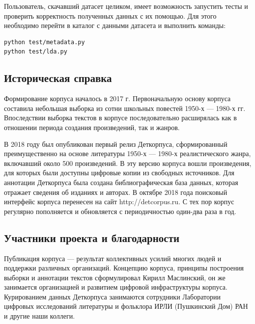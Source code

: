 \documentclass[
]{article}
\begin{document}
Пользователь, скачавший датасет целиком, имеет возможность запустить
тесты и проверить корректность полученных данных с их помощью. Для этого
необходимо перейти в каталог с данными датасета и выполнить команды:

\begin{verbatim}
python test/metadata.py
python test/lda.py
\end{verbatim}

\hypertarget{ux438ux441ux442ux43eux440ux438ux447ux435ux441ux43aux430ux44f-ux441ux43fux440ux430ux432ux43aux430}{%
\subsection{Историческая
справка}\label{ux438ux441ux442ux43eux440ux438ux447ux435ux441ux43aux430ux44f-ux441ux43fux440ux430ux432ux43aux430}}

Формирование корпуса началось в 2017 г. Первоначальную основу корпуса
составила небольшая выборка из сотни школьных повестей 1950-х --- 1980-х
гг. Впоследствии выборка текстов в корпусе последовательно расширялась
как в отношении периода создания произведений, так и жанров.

В 2018 году был опубликован первый релиз Деткорпуса, сформированный
преимущественно на основе литературы 1950-х --- 1980-х реалистического
жанра, включавший около 500 произведений. В эту версию корпуса вошли
произведения, для которых были доступны цифровые копии из свободных
источников. Для аннотации Деткорпуса была создана библиографическая база
данных, которая отражает сведения об изданиях и авторах. В октябре 2018
года поисковый интерфейс корпуса перенесен на сайт http://detcorpus.ru.
С тех пор корпус регулярно пополняется и обновляется с периодичностью
один-два раза в год.

\hypertarget{ux443ux447ux430ux441ux442ux43dux438ux43aux438-ux43fux440ux43eux435ux43aux442ux430-ux438-ux431ux43bux430ux433ux43eux434ux430ux440ux43dux43eux441ux442ux438}{%
\subsection{Участники проекта и
благодарности}\label{ux443ux447ux430ux441ux442ux43dux438ux43aux438-ux43fux440ux43eux435ux43aux442ux430-ux438-ux431ux43bux430ux433ux43eux434ux430ux440ux43dux43eux441ux442ux438}}

Публикация корпуса --- результат коллективных усилий многих людей и
поддержки различных организаций. Концепцию корпуса, принципы построения
выборки и аннотации текстов сформулировал Кирилл Маслинский, он же
занимается организацией и развитием цифровой инфраструктуры корпуса.
Курированием данных Деткорпуса занимаются сотрудники Лаборатории
цифровых исследований литературы и фольклора ИРЛИ (Пушкинский Дом) РАН и
другие наши коллеги.
\end{document}
